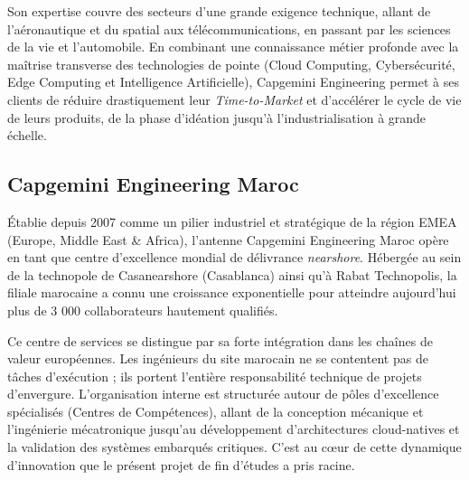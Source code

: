\documentclass[a4paper, 12pt]{report}
\begin{document}
Son expertise couvre des secteurs d'une grande exigence technique, allant de l'aéronautique et du spatial aux télécommunications, en passant par les sciences de la vie et l'automobile. En combinant une connaissance métier profonde avec la maîtrise transverse des technologies de pointe (Cloud Computing, Cybersécurité, Edge Computing et Intelligence Artificielle), Capgemini Engineering permet à ses clients de réduire drastiquement leur \textit{Time-to-Market} et d'accélérer le cycle de vie de leurs produits, de la phase d'idéation jusqu'à l'industrialisation à grande échelle.

\subsection{Capgemini Engineering Maroc}
Établie depuis 2007 comme un pilier industriel et stratégique de la région EMEA (Europe, Middle East \& Africa), l'antenne Capgemini Engineering Maroc opère en tant que centre d'excellence mondial de délivrance \textit{nearshore}. Hébergée au sein de la technopole de Casanearshore (Casablanca) ainsi qu'à Rabat Technopolis, la filiale marocaine a connu une croissance exponentielle pour atteindre aujourd'hui plus de 3 000 collaborateurs hautement qualifiés.

Ce centre de services se distingue par sa forte intégration dans les chaînes de valeur européennes. Les ingénieurs du site marocain ne se contentent pas de tâches d'exécution ; ils portent l'entière responsabilité technique de projets d'envergure. L'organisation interne est structurée autour de pôles d'excellence spécialisés (Centres de Compétences), allant de la conception mécanique et l'ingénierie mécatronique jusqu'au développement d'architectures cloud-natives et la validation des systèmes embarqués critiques. C'est au cœur de cette dynamique d'innovation que le présent projet de fin d'études a pris racine.
\end{document}
